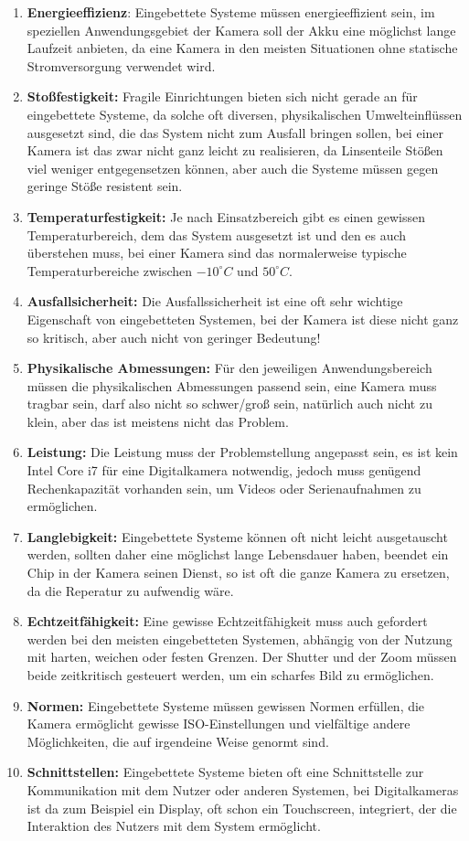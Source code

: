 \documentclass[12pt,a4paper,ngerman]{article}
\begin{document}
\begin{enumerate}
\item \textbf{Energieeffizienz}: Eingebettete Systeme müssen energieeffizient sein, im speziellen Anwendungsgebiet der Kamera soll der Akku eine möglichst lange Laufzeit anbieten, da eine Kamera in den meisten Situationen ohne statische Stromversorgung verwendet wird.  
\item \textbf{Stoßfestigkeit:} Fragile Einrichtungen bieten sich nicht gerade an für eingebettete Systeme, da solche oft diversen, physikalischen Umwelteinflüssen ausgesetzt sind, die das System nicht zum Ausfall bringen sollen, bei einer Kamera ist das zwar nicht ganz leicht zu realisieren, da Linsenteile Stößen viel weniger entgegensetzen können, aber auch die Systeme müssen gegen geringe Stöße resistent sein.
\item \textbf{Temperaturfestigkeit:} Je nach Einsatzbereich gibt es einen gewissen Temperaturbereich, dem das System ausgesetzt ist und den es auch überstehen muss, bei einer Kamera sind das normalerweise typische Temperaturbereiche zwischen $-10^\circ C$ und $50^\circ C$.
\item \textbf{Ausfallsicherheit:} Die Ausfallssicherheit ist eine oft sehr wichtige Eigenschaft von eingebetteten Systemen, bei der Kamera ist diese nicht ganz so kritisch, aber auch nicht von geringer Bedeutung!
\item \textbf{Physikalische Abmessungen:} Für den jeweiligen Anwendungsbereich müssen die physikalischen Abmessungen passend sein, eine Kamera muss tragbar sein, darf also nicht so schwer/groß sein, natürlich auch nicht zu klein, aber das ist meistens nicht das Problem.
\item \textbf{Leistung:} Die Leistung muss der Problemstellung angepasst sein, es ist kein Intel Core i7 für eine Digitalkamera notwendig, jedoch muss genügend Rechenkapazität vorhanden sein, um Videos oder Serienaufnahmen zu ermöglichen. 
\item \textbf{Langlebigkeit:} Eingebettete Systeme können oft nicht leicht ausgetauscht werden, sollten daher eine möglichst lange Lebensdauer haben, beendet ein Chip in der Kamera seinen Dienst, so ist oft die ganze Kamera zu ersetzen, da die Reperatur zu aufwendig wäre. 
\item \textbf{Echtzeitfähigkeit:} Eine gewisse Echtzeitfähigkeit muss auch gefordert werden bei den meisten eingebetteten Systemen, abhängig von der Nutzung mit harten, weichen oder festen Grenzen. Der Shutter und der Zoom müssen beide zeitkritisch gesteuert werden, um ein scharfes Bild zu ermöglichen. 
\item \textbf{Normen:} Eingebettete Systeme müssen gewissen Normen erfüllen, die Kamera ermöglicht gewisse ISO-Einstellungen und vielfältige andere Möglichkeiten, die auf irgendeine Weise genormt sind. 
\item \textbf{Schnittstellen:} Eingebettete Systeme bieten oft eine Schnittstelle zur Kommunikation mit dem Nutzer oder anderen Systemen, bei Digitalkameras ist da zum Beispiel ein Display, oft schon ein Touchscreen, integriert, der die Interaktion des Nutzers mit dem System ermöglicht. 
\end{enumerate}
\end{document}
